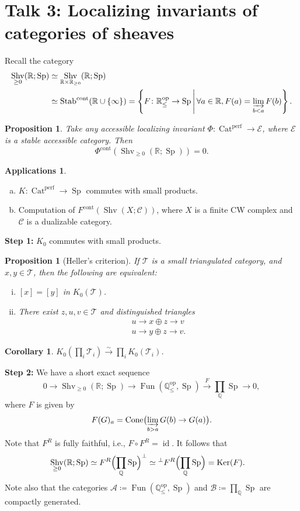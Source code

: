 \documentclass[draft]{amsart}
\newcommand{\QQ}{\mathbb{Q}}
\newcommand{\RR}{\mathbb{R}}
\newcommand{\set}[2]{\left\{#1\,\middle|\,#2\right\}}
\newcommand{\cat}[1]{\mathcal{#1}}
\newcommand{\op}{\mathrm{op}}
\newcommand{\xto}[1]{\mathbin{\xrightarrow{#1}}}
\newcommand{\isoto}{\mathbin{\xrightarrow{\sim}}}
\newcommand{\Stab}{\mathrm{Stab}}
\DeclareMathOperator{\Shv}{Shv}
\DeclareMathOperator{\Cat}{Cat}
\DeclareMathOperator{\Sp}{Sp}
\DeclareMathOperator{\Fun}{Fun}
\DeclareMathOperator{\id}{id}
\DeclareMathOperator{\Ker}{Ker}
\DeclareMathOperator{\Cone}{Cone}
\newtheorem{prop}[thm]{Proposition}
\newtheorem{cor}[thm]{Corollary}
\theoremstyle{definition}
\newtheorem{applications}[thm]{Applications}
\begin{document}
\section{Talk 3: Localizing invariants of categories of sheaves}
Recall the category 
\begin{align*}
\Shv_{\ge0}(\RR;\Sp) &\simeq \Shv_{\RR\times \RR_{\ge0}}(\RR; \Sp) \\
&\simeq \Stab^{\mathrm{cont}}(\RR\cup \{\infty\}) 
= \set{F\colon \RR_{\le}^{\op} \to \Sp}{\forall a\in \RR, F(a) = \varinjlim_{b<a} F(b)}.
\end{align*}

\begin{prop}
Take any accessible localizing invariant $\Phi\colon \Cat^{\mathrm{perf}} \to \cat E$, where $\cat E$ is a stable accessible category. Then
\[
\Phi^{\mathrm{cont}}(\Shv_{\ge0}(\RR;\Sp)) = 0.
\]
\end{prop}

\begin{applications}
\begin{enumerate}[(a)]
\item $K\colon \Cat^{\mathrm{perf}} \to \Sp$ commutes with small products.
\item Computation of $F^{\mathrm{cont}}(\Shv(X;\cat C))$, where $X$ is a finite CW complex and $\cat C$ is a dualizable category.
\end{enumerate}
\end{applications}

\textbf{Step 1:} $K_0$ commutes with small products.
\begin{prop}[Heller's criterion]
If $\cat T$ is a small triangulated category, and $x,y\in \cat T$, then the following are equivalent:
\begin{enumerate}[(i)]
\item $[x] = [y]$ in $K_0(\cat T)$.
\item There exist $z,u,v\in \cat T$ and distinguished triangles 
\begin{align*}
u \to x\oplus z \to v \\
u \to y\oplus z \to v.
\end{align*}
\end{enumerate}
\end{prop}

\begin{cor}
$K_0(\prod_i \cat T_i)\isoto \prod_i K_0(\cat T_i)$.
\end{cor}

\textbf{Step 2:} We have a short exact sequence
\[
0\to \Shv_{\ge0}(\RR; \Sp) \to \Fun(\QQ_{\le}^{\op}, \Sp)\xto{F} \prod_{\QQ} \Sp \to 0,
\]
where $F$ is given by
\[
F(G)_a = \Cone\bigl(\varinjlim_{b>a} G(b) \to G(a)\bigr).
\]
Note that $F^R$ is fully faithful, i.e., $F\circ F^R = \id$. It follows that
\begin{align*}
\Shv_{\ge0}(\RR; \Sp) &\simeq F^R\Bigl(\prod_{\QQ}\Sp\Bigr)^{\perp} \simeq {}^{\perp} F^R\Bigl(\prod_{\QQ}\Sp\Bigr) = \Ker(F).
\end{align*}
Note also that the categories $\cat A\coloneqq \Fun(\QQ_{\le}^\op, \Sp)$ and $\cat B \coloneqq \prod_{\QQ}\Sp$ are compactly generated.
\end{document}
